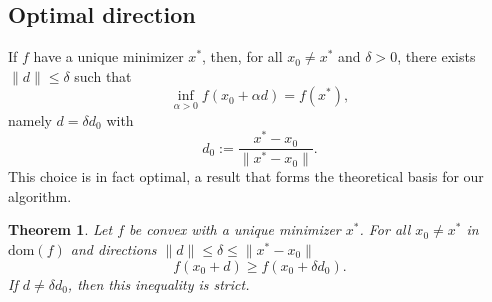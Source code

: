 \documentclass[12pt]{article}
\newtheorem{theorem}{Theorem}
\begin{document}
\subsection{Optimal direction}

If $f$ have a unique minimizer $x^{\ast}$, then, for all $x_{0} \ne x^{\ast}$ and $\delta > 0$, there exists $\lVert d \rVert \le \delta$ such that
\begin{equation*}
\inf_{\alpha > 0} f( x_{0} + \alpha d ) = f(x^{\ast}),
\end{equation*}
namely $d = \delta d_{0}$ with
\begin{equation*}
d_{0} := \frac{x^{\ast} - x_{0}}{\lVert x^{\ast} - x_{0} \lVert }.
\end{equation*}
This choice is in fact optimal, a result that forms the theoretical basis for our algorithm.

\begin{theorem}
\label{theorem_optimal_direction}
Let $f$ be convex with a unique minimizer $x^{\ast}$.
For all $x_{0} \ne x^{\ast}$ in $\mathrm{dom}(f)$ and directions $\lVert d \rVert \le \delta \le \lVert x^{\ast} - x_{0} \rVert$
\begin{equation*}
f(x_{0} + d) \ge f(x_{0} + \delta d_{0}).
\end{equation*}
If $d \ne \delta d_{0}$, then this inequality is strict.
\end{theorem}
\end{document}
